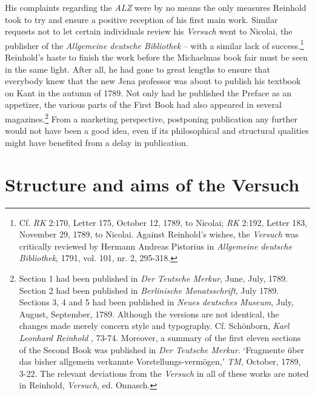   His complaints regarding the \textit{ALZ} were by no means the only measures Reinhold took to try and ensure a positive reception of his first main work. Similar requests not to let certain individuals review his \textit{Versuch} went to Nicolai, the publisher of the \textit{Allgemeine deutsche Bibliothek} {--} with a similar lack of success.\footnote{ Cf. \textit{RK} 2:170, Letter 175, October 12, 1789, to Nicolai; \textit{RK} 2:192, Letter 183, November 29, 1789, to Nicolai. Against Reinhold's wishes, the \textit{Versuch} was critically reviewed by Hermann Andreas Pistorius in \textit{Allgemeine deutsche Bibliothek}, 1791, vol. 101, nr. 2, 295{-}318. } Reinhold's haste to finish the work before the Michaelmas book fair must be seen in the same light. After all, he had gone to great lengths to ensure that everybody knew that the new Jena professor was about to publish his textbook on Kant in the autumn of 1789. Not only had he published the Preface as an appetizer, the various parts of the First Book had also appeared in several magazines.\footnote{\label{footnote:_Ref211329357} Section 1 had been published in \textit{Der Teutsche Merkur}, June, July, 1789. Section 2 had been published in \textit{Berlinische Monatsschrift}, July 1789. Sections 3, 4 and 5 had been published in \textit{Neues deutsches Museum}, July, August, September, 1789. Although the versions are not identical, the changes made merely concern style and typography. Cf. Sch\"{o}nborn, \textit{Karl Leonhard Reinhold }, 73{-}74. Moreover, a summary of the first eleven sections of the Second Book was published in \textit{Der Teutsche Merkur}. `Fragmente \"{u}ber das bisher allgemein verkannte Vorstellungs{-}verm\"{o}gen,' \textit{TM}, October, 1789, 3{-}22. The relevant deviations from the \textit{Versuch }in all of these works are noted in Reinhold, \textit{Versuch}, ed. Onnasch. } From a marketing perspective, postponing publication any further would not have been a good idea, even if its philosophical and structural qualities might have benefited from a delay in publication. 


\section{Structure and aims of the Versuch}


